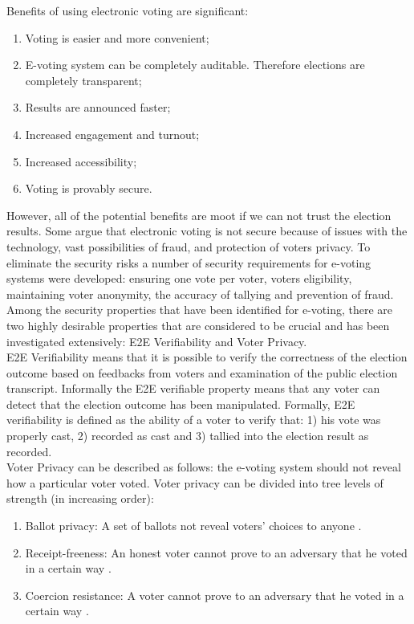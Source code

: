 Benefits of using electronic voting  are significant:
\begin{enumerate}
\item Voting is easier and more convenient;
\item E-voting system can be completely auditable. Therefore elections are completely transparent;
\item Results are announced faster;
\item Increased engagement and turnout; 
\item Increased accessibility;
\item Voting is provably secure.
 \end{enumerate}

However, all of the potential benefits are moot if we can not trust the election results. Some argue that electronic voting is not secure because of issues with the technology, vast possibilities of fraud, and protection of voters privacy.  To eliminate the security risks a number of security requirements for e-voting systems were developed: ensuring one vote per voter, voters eligibility, maintaining voter anonymity, the accuracy of tallying and prevention of fraud.\\
 
Among the security properties that have been identified for e-voting, there are two highly desirable properties that are considered to be crucial and has been investigated extensively: E2E Verifiability and Voter Privacy.\\

 E2E Verifiability means that it is possible to verify the correctness of the election outcome based on feedbacks from voters and examination of the public election transcript. Informally the E2E verifiable property means that any voter can detect that the election outcome has been manipulated.  Formally, E2E verifiability is defined as the ability of a voter  to verify that: 1) his vote was properly cast, 2) recorded as cast and 3) tallied into the election result as recorded. \\
 
 Voter Privacy can be described as follows: the e-voting system should not reveal how a particular voter voted. Voter privacy can be divided into tree levels of  strength (in increasing order):
\begin{enumerate}
\item Ballot privacy: A set of ballots  not reveal  voters' choices to anyone \cite{Bernhard2015}. 
\item Receipt-freeness: An honest voter cannot prove to an adversary that he voted in a certain way \cite{Kremer}.
\item Coercion resistance: A 
 voter cannot prove to an adversary that he voted in a certain way \cite{Delaune2006}.
\end{enumerate}

